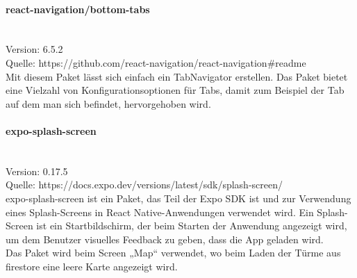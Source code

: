 \paragraph{react-navigation/bottom-tabs}\mbox{}\\
Version: 6.5.2\\
Quelle: https://github.com/react-navigation/react-navigation\#readme\\
Mit diesem Paket lässt sich einfach ein TabNavigator erstellen. Das Paket bietet eine Vielzahl von Konfigurationsoptionen für Tabs, damit zum Beispiel der Tab auf dem man sich befindet, hervorgehoben wird.\\

\paragraph{expo-splash-screen}\mbox{}\\
Version: 0.17.5\\
Quelle: https://docs.expo.dev/versions/latest/sdk/splash-screen/\\
expo-splash-screen ist ein Paket, das Teil der Expo SDK ist und zur Verwendung eines Splash-Screens in React Native-Anwendungen verwendet wird. Ein Splash-Screen ist ein Startbildschirm, der beim Starten der Anwendung angezeigt wird, um dem Benutzer visuelles Feedback zu geben, dass die App geladen wird.\\
Das Paket wird beim Screen „Map“ verwendet, wo beim Laden der Türme aus firestore eine leere Karte angezeigt wird.\\


